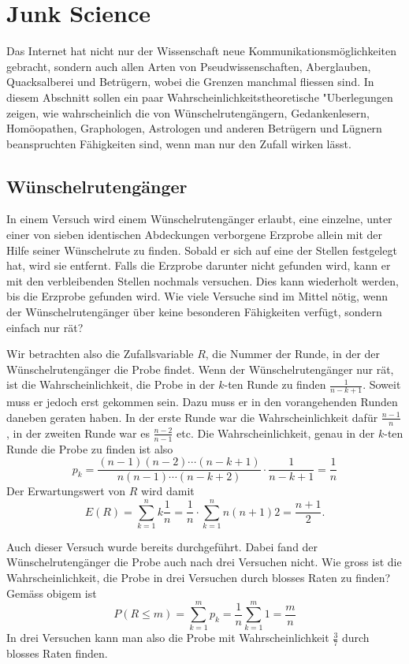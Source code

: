%
%
%
\chapter{Junk Science}
Das Internet hat nicht nur der Wissenschaft neue Kommunikationsmöglichkeiten
gebracht, sondern auch allen Arten von Pseudwissenschaften,
Aberglauben, Quacksalberei und Betrügern, wobei die Grenzen manchmal
fliessen sind.
In diesem Abschnitt sollen ein paar Wahrscheinlichkeitstheoretische
"Uberlegungen zeigen, wie wahrscheinlich die von Wünschelrutengängern,
Gedankenlesern, Homöo\-pathen, Graphologen, Astrologen und anderen Betrügern
und Lügnern beanspruchten Fähigkeiten sind, wenn man nur den Zufall wirken
lässt.

\section{Wünschelrutengänger}
In einem Versuch wird einem Wünschelrutengänger erlaubt, eine einzelne,
unter einer von sieben identischen Abdeckungen verborgene Erzprobe allein
mit der Hilfe seiner Wünschelrute zu finden.
Sobald er sich auf eine
der Stellen festgelegt hat, wird sie entfernt.
Falls die Erzprobe darunter
nicht gefunden wird, kann er mit den verbleibenden Stellen nochmals
versuchen.
Dies kann wiederholt werden, bis die Erzprobe gefunden wird.
Wie viele Versuche sind im Mittel nötig, wenn der Wünschelrutengänger
über keine besonderen Fähigkeiten verfügt, sondern einfach nur rät?

Wir betrachten also die Zufallsvariable $R$, die Nummer der Runde, in der
der Wünschelrutengänger die Probe findet.
Wenn der Wünschelrutengänger
nur rät, ist die Wahrscheinlichkeit, die Probe in der $k$-ten Runde zu finden
$\frac1{n-k+1}$.
Soweit muss er jedoch erst gekommen sein.
Dazu muss er in
den vorangehenden Runden daneben geraten haben.
In der erste
Runde war die Wahrscheinlichkeit dafür $\frac{n-1}n$, in der zweiten
Runde war es $\frac{n-2}{n-1}$ etc.
Die Wahrscheinlichkeit, genau in der
$k$-ten Runde die Probe zu finden ist also
\[
p_k=\frac{(n-1)(n-2)\cdots (n-k+1)}{n(n-1)\cdots(n-k+2)}\cdot\frac1{n-k+1}=\frac1n
\]
Der Erwartungswert von $R$ wird damit
\[
E(R)=\sum_{k=1}^nk\frac1n=\frac1n\cdot\sum_{k=1}^n{n(n+1)}2=\frac{n+1}2.
\]

Auch dieser Versuch wurde bereits durchgeführt.
Dabei fand der Wünschelrutengänger
die Probe auch nach drei Versuchen nicht.
Wie gross ist die Wahrscheinlichkeit,
die Probe in drei Versuchen durch blosses Raten zu finden? Gemäss obigem ist
$$P(R\le m)= \sum_{k=1}^mp_k=\frac1n\sum_{k=1}^m1=\frac{m}{n}$$
In drei Versuchen kann man also die Probe mit Wahrscheinlichkeit $\frac37$ durch
blosses Raten finden.

